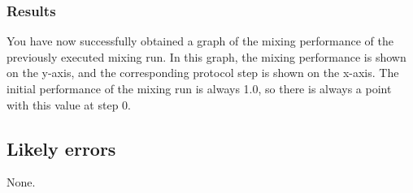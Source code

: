 
\subsubsection{Results}
You have now successfully obtained a graph of the mixing performance of the previously executed mixing run. In this graph, the mixing performance is shown on the y-axis, and the corresponding protocol step is shown on the x-axis. The initial performance of the mixing run is always 1.0, so there is always a point with this value at step 0.

\subsection{Likely errors}
None.


%
%
%
%
%
%
